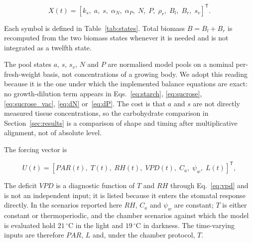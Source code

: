 \begin{equation}
X(t) =
\left[
k_s,\; a,\; s,\; \alpha_N,\; \alpha_P,\; N,\; P,\; \rho_r,\; B_l,\; B_r,\; s_v
\right]^{\mathsf{T}}.
\label{eq:state_vector}
\end{equation}

Each symbol is defined in Table~\ref{tab:states}. Total biomass $B = B_l + B_r$ is
recomputed from the two biomass states whenever it is needed and is not integrated
as a twelfth state.

The pool states $a$, $s$, $s_v$, $N$ and $P$ are normalised model pools on a
nominal per-fresh-weight basis, not concentrations of a growing body. We adopt
this reading because it is the one under which the implemented balance equations
are exact: no growth-dilution term appears in Eqs.~\eqref{eq:starch},
\eqref{eq:sucrose}, \eqref{eq:sucrose_vac}, \eqref{eq:dN} or~\eqref{eq:dP}. The
cost is that $a$ and $s$ are not directly measured tissue concentrations, so the
carbohydrate comparison in Section~\ref{sec:results} is a comparison of shape and
timing after multiplicative alignment, not of absolute level.

The forcing vector is

\begin{equation}
U(t) =
\left[
\mathit{PAR}(t),\; T(t),\; \mathit{RH}(t),\; \mathit{VPD}(t),\; C_a,\;
\psi_w,\; L(t)
\right]^{\mathsf{T}},
\label{eq:input_vector}
\end{equation}

The deficit $\mathit{VPD}$ is a diagnostic function of $T$ and $\mathit{RH}$
through Eq.~\eqref{eq:vpd} and is not an independent input; it is listed because it
enters the stomatal response directly. In the scenarios reported here
$\mathit{RH}$, $C_a$ and $\psi_w$ are constant; $T$ is either constant or
thermoperiodic, and the chamber scenarios against which the model is evaluated
hold $21\,^{\circ}$C in the light and $19\,^{\circ}$C in darkness. The
time-varying inputs are therefore $\mathit{PAR}$, $L$ and, under the chamber
protocol, $T$.

